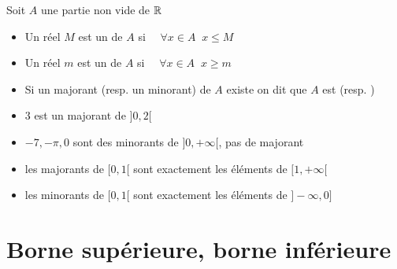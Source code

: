 \begin{frame}

\begin{mydefinition}
Soit $A$ une partie non vide de $\mathbb{R}$
\begin{itemize}
  \item  Un réel $M$ est un
 de $A$ si \ \ $\forall x \in A \;\; x\leq M$
\pause
  \item Un réel $m$ est un  de $A$ si \ \ $\forall x \in A \;\; x\geq m$
\pause
  \item Si un majorant (resp. un minorant) de $A$ existe on dit que $A$ est  (resp. )
\end{itemize}
\end{mydefinition}

\pause
\begin{exemple}
\begin{itemize}
  \item $3$ est un majorant de $]0,2[$
\pause
  \item $-7,-\pi,0$ sont des minorants de $]0,+\infty[$, pas de majorant
\pause
  \item les majorants de $[0,1[$ sont exactement les éléments de $[1,+\infty[$
\pause
  \item les minorants de $[0,1[$ sont exactement les éléments de $]-\infty,0]$
\pause
{}
\end{itemize}
\end{exemple}

\end{frame}




\section*{Borne supérieure, borne inférieure}

